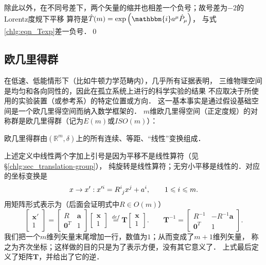 除此以外，在不同号差下，两个矢量的缩并也相差一个负号；故号差为$-2$的Lorentz度规下平移
算符是$\hat{T}(m) = \exp\left(\mathbbm{i} a^\mu \hat{P}_\mu  \right) $，
与式\eqref{chlg:eqn_Texp}差一负号．\qed



\subsection{欧几里得群}\label{chlg:sec_Euclidean-group}
在低速、低能情形下（比如牛顿力学范畴内），几乎所有证据表明，
三维物理空间是均匀和各向同性的，因此在孤立系统上进行的科学实验的结果
不应取决于所使用的实验装置（或参考系）的特定位置或方向．
这一基本事实是通过假设基础空间是一个欧几里得空间而纳入数学框架的．
$m$维欧几里得空间（正定度规）的对称群是欧几里得群（记为$E(m)$或$ISO(m)$）：
\begin{definition}
    欧几里得群由$(\mathbb{R}^m,\delta)$上的所有连续、等距、“线性”变换组成．
\end{definition}
上述定义中线性两个字加上引号是因为平移不是线性算符（见\S\ref{chlg:sec_translation-group}），
纯旋转是线性算符；无穷小平移是线性的．对应的坐标变换是
\begin{equation}\label{chlg:eqn_trans-rot}
    x\to x' : x'^{i} = R^i_{\hphantom{i} j}x^j + a^i ,\qquad  1 \leqslant i \leqslant m .
\end{equation}
用矩阵形式表示为（后面会证明式中$R\in O(m)$）
\begin{equation}\label{chlg:eqn_Em-max}
    \begin{bmatrix}  \boldsymbol{x}' \\ 1 \end{bmatrix} =
    \begin{bmatrix}  R & \boldsymbol{a} \\ \boldsymbol{0}^T & 1  \end{bmatrix}
    \begin{bmatrix}  \boldsymbol{x} \\ 1 \end{bmatrix} 
    \  \overset{def}{=} \boldsymbol{T} \begin{bmatrix}  \boldsymbol{x} \\ 1 \end{bmatrix} .
    \qquad \boldsymbol{T}^{-1} = 
    \begin{bmatrix}    R^{-1} & -R^{-1} \boldsymbol{a} \\ \boldsymbol{0}^T & 1    \end{bmatrix} .
\end{equation}
我们把一个$m$维列矢量末尾增加一行，数值为$1$；从而变成了$m+1$维列矢量，
称之为{\heiti 齐次坐标}；这样做的目的只是为了表示方便，没有其它意义了．
上式最后定义了矩阵$\boldsymbol{T}$，并给出了它的逆．

